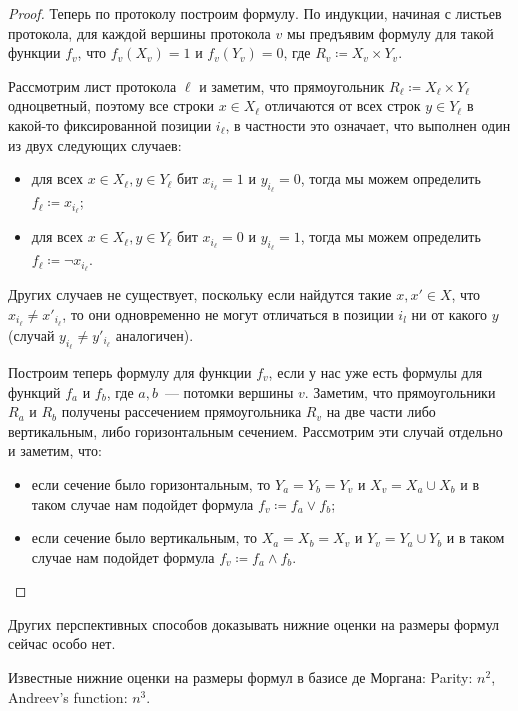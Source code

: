 \begin{proof}
    Теперь по протоколу построим формулу. По индукции, начиная с листьев протокола, для каждой вершины
    протокола $v$ мы предъявим формулу для такой функции $f_v$, что $f_v(X_v) = 1$ и $f_v(Y_v) = 0$,
    где $R_v \coloneqq X_v \times Y_v$.

    Рассмотрим лист протокола $\ell$ и заметим, что прямоугольник $R_{\ell} \coloneqq X_{\ell} \times
    Y_{\ell}$ одноцветный, поэтому все строки $x \in X_{\ell}$ отличаются от всех строк $y \in Y_{\ell}$
    в какой-то фиксированной позиции $i_{\ell}$, в частности это означает, что выполнен один из двух
    следующих случаев:
    \begin{itemize}
        \item для всех $x \in X_{\ell}, y \in Y_{\ell}$ бит $x_{i_{\ell}} = 1$ и $y_{i_{\ell}} = 0$,
            тогда мы можем определить $f_{\ell} \coloneqq x_{i_{\ell}}$;
        \item для всех $x \in X_{\ell}, y \in Y_{\ell}$ бит $x_{i_{\ell}} = 0$ и $y_{i_{\ell}} = 1$,
            тогда мы можем определить $f_{\ell} \coloneqq \neg x_{i_{\ell}}$.
    \end{itemize}
    Других случаев не существует, поскольку если найдутся такие $x, x' \in X$, что $x_{i_{\ell}} \neq
    x'_{i_{\ell}}$, то они одновременно не могут отличаться в позиции $i_l$ ни от какого $y$ (случай
    $y_{i_{\ell}} \neq y'_{i_{\ell}}$ аналогичен).

    Построим теперь формулу для функции $f_v$, если у нас уже есть формулы для функций $f_a$ и $f_b$, где
    $a, b$~--- потомки вершины $v$. Заметим, что прямоугольники $R_a$ и $R_b$ получены рассечением
    прямоугольника $R_v$ на две части либо вертикальным, либо горизонтальным сечением. Рассмотрим эти
    случай отдельно и заметим, что:
    \begin{itemize}
        \item если сечение было горизонтальным, то $Y_a = Y_b = Y_v$ и $X_v = X_a \cup X_b$ и в таком
            случае нам подойдет формула $f_v \coloneqq f_a \vee f_b$;
        \item если сечение было вертикальным, то $X_a = X_b = X_v$ и $Y_v = Y_a \cup Y_b$ и в таком
            случае нам подойдет формула $f_v \coloneqq f_a \wedge f_b$.
    \end{itemize}
\end{proof}


Других перспективных способов доказывать нижние оценки на размеры формул сейчас особо нет.

\begin{remark}
    Известные нижние оценки на размеры формул в базисе де Моргана: Parity: $n^2$, Andreev's function:
    $n^3$.
\end{remark}



